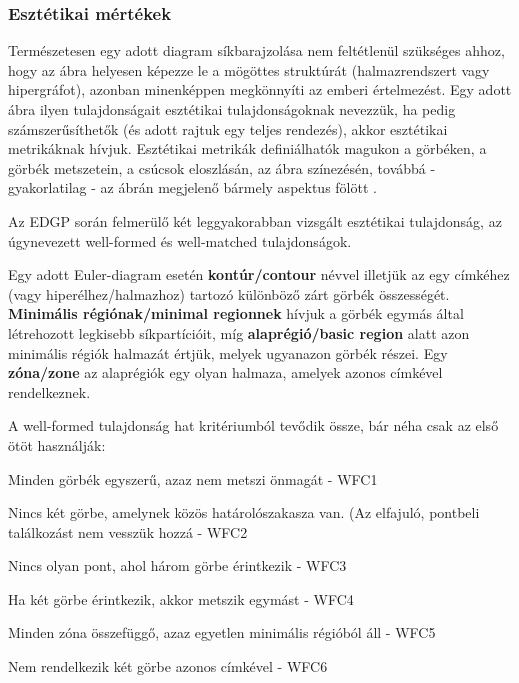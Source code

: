 \subsubsection{Esztétikai mértékek}

Természetesen egy adott diagram síkbarajzolása nem feltétlenül szükséges ahhoz, hogy az ábra helyesen képezze le a mögöttes struktúrát (halmazrendszert vagy hipergráfot), azonban minenképpen megkönnyíti az emberi értelmezést. Egy adott ábra ilyen tulajdonságait esztétikai tulajdonságoknak nevezzük, ha pedig számszerűsíthetők (és adott rajtuk egy teljes rendezés), akkor esztétikai metrikáknak hívjuk. Esztétikai metrikák definiálhatók magukon a görbéken, a görbék metszetein, a csúcsok eloszlásán, az ábra színezésén, továbbá - gyakorlatilag - az ábrán megjelenő bármely aspektus fölött \cite{euler_force, which_well_formed, layout_metrics}.


Az EDGP során felmerülő két leggyakorabban vizsgált\cite{well_matchedness, euler_force, which_well_formed, orientation_comprehension} esztétikai tulajdonság, az úgynevezett well-formed és well-matched tulajdonságok.

\begin{definition}
Egy adott Euler-diagram esetén \textbf{kontúr/contour} névvel illetjük az egy címkéhez (vagy hiperélhez/halmazhoz) tartozó különböző zárt görbék összességét. \textbf{Minimális régiónak/minimal regionnek} hívjuk a görbék egymás által létrehozott legkisebb síkpartícióit, míg \textbf{alaprégió/basic region} alatt azon minimális régiók halmazát értjük, melyek ugyanazon görbék részei. Egy \textbf{zóna/zone} az alaprégiók egy olyan halmaza, amelyek azonos címkével rendelkeznek.
\end{definition}

A well-formed tulajdonság hat kritériumból tevődik össze, bár néha csak az első ötöt használják:

\begin{compactenum}
	\item Minden görbék egyszerű, azaz nem metszi önmagát - WFC1
	\item Nincs két görbe, amelynek közös határolószakasza van. (Az elfajuló, pontbeli találkozást nem vesszük hozzá - WFC2
	\item Nincs olyan pont, ahol három görbe érintkezik - WFC3
	\item Ha két görbe érintkezik, akkor metszik egymást - WFC4
	\item Minden zóna összefüggő, azaz egyetlen minimális régióból áll - WFC5
	\item Nem rendelkezik két görbe azonos címkével - WFC6\\
\end{compactenum}


